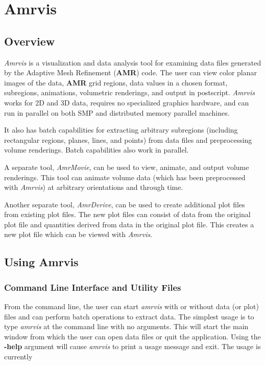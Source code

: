 \section{Amrvis}

\subsection{Overview}

{\em Amrvis} is a visualization and data analysis tool for
examining data files generated by the Adaptive Mesh Refinement
({\bf AMR}) code.  The user can view color planar images of the data,
{\bf AMR} grid regions, data values in a chosen format, subregions, animations,
volumetric renderings, and output in postscript.  {\em Amrvis} works
for 2D and 3D data, requires no specialized graphics hardware, and
can run in parallel on both SMP and distributed memory parallel machines.

It also has batch capabilities for extracting arbitrary subregions
(including rectangular regions, planes, lines, and points) from data files and
preprocessing volume renderings.  Batch capabilities also work in parallel.

A separate tool, {\em AmrMovie}, can be used to view, animate, and output volume
renderings.  This tool can animate volume data (which has been preprocessed
with {\em Amrvis}) at arbitrary orientations and through time.

Another separate tool, {\em AmrDerive}, can be used to create additional
plot files from existing plot files.  The new plot files can consist of
data from the original plot file and quantities derived from data in 
the original plot file.  This creates a new plot file which can be
viewed with {\em Amrvis}.

\subsection{Using Amrvis}

\subsubsection{Command Line Interface and Utility Files}

From the command line, the user can start {\em amrvis} with or without
data (or plot) files and can perform batch operations
to extract data.  The simplest usage is to type {\em amrvis} at the command
line with no arguments.  This will start the main window from which
the user can open data files or quit the application.  Using the {\bf -help}
argument will cause {\em amrvis} to print a usage message and exit.  The usage
is currently

